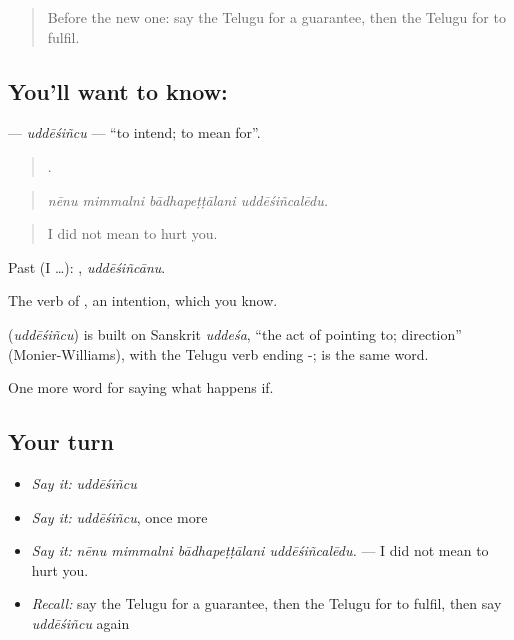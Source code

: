 \label{lesson:TE-C422-uddesincu}



\begin{quote}
Before the new one: say the Telugu for a guarantee, then the Telugu for to fulfil.
\end{quote}

\subsection*{You'll want to know: }
\textbf{} — \emph{uddēśiñcu} — \textquotedblleft{}to intend; to mean for\textquotedblright{}.

\begin{quote}
   .
\end{quote}

\begin{quote}
\emph{nēnu mimmalni bādhapeṭṭālani uddēśiñcalēdu.}
\end{quote}

\begin{quote}
I did not mean to hurt you.
\end{quote}

Past (I …): , \emph{uddēśiñcānu}.

The verb of , an intention, which you know.

\begin{cousinweb}
\textbf{} (\emph{uddēśiñcu}) is built on Sanskrit \emph{uddeśa}, \textquotedblleft{}the act of pointing to; direction\textquotedblright{} (Monier-Williams), with the Telugu verb ending -;  is the same word.
\end{cousinweb}

\begin{grammarlens}[title={What you've built}]
One more word for saying what happens if.
\end{grammarlens}

\subsection*{Your turn}
\begin{itemize}
\raggedright
  \item \emph{Say it:} \emph{uddēśiñcu}
  \item \emph{Say it:} \emph{uddēśiñcu}, once more
  \item \emph{Say it:} \emph{nēnu mimmalni bādhapeṭṭālani uddēśiñcalēdu.} — I did not mean to hurt you.
  \item \emph{Recall:} say the Telugu for a guarantee, then the Telugu for to fulfil, then say \emph{uddēśiñcu} again
\end{itemize}

